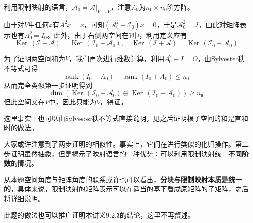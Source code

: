 \documentclass[a4paper,UTF8,fontset=windows]{ctexart}
\DeclareMathOperator{\rank}{rank}
\DeclareMathOperator{\Ker}{Ker\,}
\newcommand*{\ma}{\mathcal{A}}
\newcommand*{\mi}{\mathcal{I}}
\newcommand*{\note}{\noindent *}
\begin{document}
\begin{enumerate}
\begin{itemize}
        \note 利用限制映射的语言，$\ma_0=\ma|_{V\to V}$，注意$A_0$为$n_0\times n_0$阶方阵。

        由于对$V$中任何$x$有$A^2x=x$，可知$(\ma_0^2-\mi_0)x=0$，于是$\ma_0^2=\mi$，由此对矩阵表示也有$A_0^2=I_0$。此外，由于右侧两空间在$V$中，利用定义应有
        $$\Ker(\mi-\ma)=\Ker(\mi_0-\ma_0),\quad\Ker(\mi+\ma)=\Ker(\mi_0+\ma_0)$$

        为了证明两空间和为$V$，我们再次进行维数计算，利用$A_0^2-I=O$，由Sylvester秩不等式可得
        $$\rank(I_0-A_0)+\rank(I_0+A_0)\le n_0$$
        从而完全类似第一步证明得到
        $$\dim(\Ker(\mi_0-\ma_0)\oplus\Ker(\mi_0+\ma_0))\ge n_0$$
        但此空间又在$V$中，因此只能为$V$，得证。

        \note 这里事实上也可以由Sylvester秩不等式直接说明，见之后证明根子空间的和是直和时的做法。
    \end{itemize}

    \note 大家或许注意到了两步证明的相似性。事实上，它们在进行类似的化归操作。第二步证明虽然抽象，但是揭示了映射语言的一种优势：可以利用限制映射统一\textbf{不同阶数}的情况。
    
    \note 从本题空间角度与矩阵角度的联系或许也可以看出，\textbf{分块与限制映射本质是统一的}，具体来说，限制映射的矩阵表示可以在适当的基下看成原矩阵的子矩阵，之后将详细说明。

    \note 此题的做法也可以推广证明本讲义9.2.3的结论，这里不再赘述。

\end{enumerate}
\end{document}
